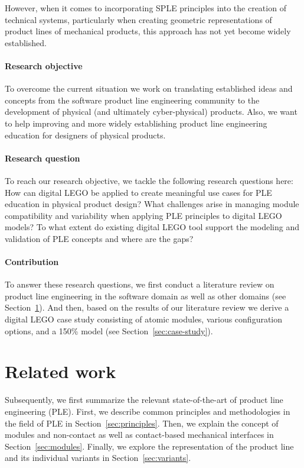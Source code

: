 \documentclass[sigconf,review]{acmart}
\begin{document}
However, when it comes to incorporating SPLE principles into the creation of technical systems, particularly when creating geometric representations of product lines of mechanical products, this approach has not yet become widely established. 

\paragraph{Research objective}

To overcome the current situation we work on translating established ideas and concepts from the software product line engineering community to the development of physical (and ultimately cyber-physical) products.
Also, we want to help improving and more widely establishing product line engineering education for designers of physical products.

\paragraph{Research question}

To reach our research objective, we tackle the following research questions here:
How can digital LEGO be applied to create meaningful use cases for PLE education in physical product design?
What challenges arise in managing module compatibility and variability when applying PLE principles to digital LEGO models?
To what extent do existing digital LEGO tool support the modeling and validation of PLE concepts and where are the gaps?

\paragraph{Contribution}

To answer these research questions, we first conduct a literature review on product line engineering in the software domain as well as other domains (see Section~\ref{sec:related-work}).
And then, based on the results of our literature review we derive a digital LEGO case study consisting of atomic modules, various configuration options, and a 150\% model (see Section~\ref{sec:case-study}).

\section{Related work}
\label{sec:related-work}

Subsequently, we first summarize the relevant state-of-the-art of product line engineering (PLE).
First, we describe common principles and methodologies in the field of PLE in Section~\ref{sec:principles}.
Then, we explain the concept of modules and non-contact as well as contact-based mechanical interfaces in Section~\ref{sec:modules}.
Finally, we explore the representation of the product line and its individual variants in Section~\ref{sec:variants}.
\end{document}
